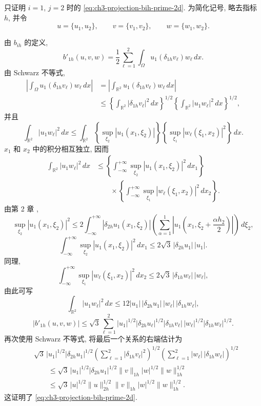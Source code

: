 \begin{Proof}
只证明 $i=1$, $j=2$ 时的 \eqref{eq:ch3-projection-bih-prime-2d}. 为简化记号, 略去指标 $h$, 并令
\[
u=\{u_1,u_2\},\qquad v=\{v_1,v_2\},\qquad w=\{w_1,w_2\}.
\]

\hypertarget{chapter-03-page-298}{}
由 $b_{ih}$ 的定义,
\[
b'_{1h}(u,v,w)=\frac12\sum_{\ell=1}^2
\int_\Omega u_1(\delta_{1h}v_\ell)w_\ell\,dx.
\]
由 Schwarz 不等式,
\[
\begin{aligned}
\left|\int_\Omega u_1(\delta_{1h}v_\ell)w_\ell\,dx\right|
&=\left|\int_{\mathbb R^2}u_1(\delta_{1h}v_\ell)w_\ell\,dx\right|\\
&\leq
\left\{\int_{\mathbb R^2}|\delta_{1h}v_\ell|^2\,dx\right\}^{1/2}
\left\{\int_{\mathbb R^2}|u_1w_\ell|^2\,dx\right\}^{1/2},
\end{aligned}
\]
并且
\[
\int_{\mathbb R^2}|u_1w_\ell|^2\,dx
\leq\int_{\mathbb R^2}
\left\{\sup_{\xi_2}|u_1(x_1,\xi_2)|\right\}
\left\{\sup_{\xi_1}|w_\ell(\xi_1,x_2)|^2\right\}\,dx.
\]
$x_1$ 和 $x_2$ 中的积分相互独立, 因而
\[
\begin{aligned}
\int_{\mathbb R^2}|u_1w_\ell|^2\,dx
&\leq
\left\{\int_{-\infty}^{+\infty}
\sup_{\xi_2}|u_1(x_1,\xi_2)|^2\,dx_1\right\}\\
&\qquad{}\times
\left\{\int_{-\infty}^{+\infty}
\sup_{\xi_1}|w_\ell(\xi_1,x_2)|^2\,dx_2\right\}.
\end{aligned}
\]
由第 2 章 ,
\[
\sup_{\xi_2}|u_1(x_1,\xi_2)|^2
\leq2\int_{-\infty}^{+\infty}
|\delta_{2h}u_1(x_1,\xi_2)|
\left(\sum_{\alpha=1}^{1}
\left|u_1\left(x_1,\xi_2+\frac{\alpha h_2}{2}\right)\right|\right)\,d\xi_2,
\]
\[
\int_{-\infty}^{+\infty}
\sup_{\xi_2}|u_1(x_1,\xi_2)|^2\,dx_1
\leq2\sqrt3\,|\delta_{2h}u_1|\,|u_1|.
\]
同理,
\[
\int_{-\infty}^{+\infty}
\sup_{\xi_1}|w_\ell(\xi_1,x_2)|^2\,dx_2
\leq2\sqrt3\,|\delta_{1h}w_\ell|\,|w_\ell|,
\]
由此可写
\[
\int_{\mathbb R^2}|u_1w_\ell|^2\,dx
\leq12|u_1|\,|\delta_{2h}u_1|\,|w_\ell|\,|\delta_{1h}w_\ell|,
\]
\[
|b'_{1h}(u,v,w)|
\leq\sqrt3\sum_{\ell=1}^2
|u_1|^{1/2}|\delta_{2h}u_\ell|^{1/2}
|\delta_{1h}v_\ell|\,|w_\ell|^{1/2}
|\delta_{1h}w_\ell|^{1/2}.
\]
再次使用 Schwarz 不等式, 将最后一个关系的右端估计为
\[
\begin{aligned}
&\sqrt3\,|u_1|^{1/2}|\delta_{2h}u_1|^{1/2}
\left(\sum_{\ell=1}^2|\delta_{1h}v_\ell|^2\right)^{1/2}
\left(\sum_{\ell=1}^2|w_\ell|\,|\delta_{1h}w_\ell|\right)^{1/2}\\
&\qquad\leq\sqrt3\,|u_1|^{1/2}|\delta_{2h}u_1|^{1/2}
\lVert v\rVert_{1h}|w|^{1/2}\lVert w\rVert_{1h}^{1/2}\\
&\qquad\leq\sqrt3\,|u|^{1/2}\lVert u\rVert_{2h}^{1/2}
\lVert v\rVert_{1h}|w|^{1/2}\lVert w\rVert_{1h}^{1/2}.
\end{aligned}
\]
这证明了 \eqref{eq:ch3-projection-bih-prime-2d}.


\end{Proof}
